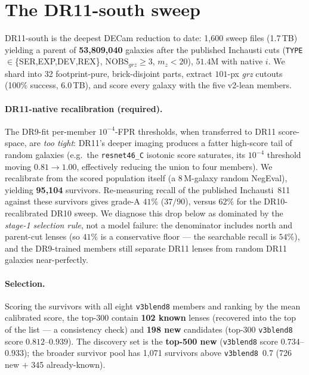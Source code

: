 \documentclass[11pt,letterpaper]{article}
\newcommand{\vb}{\texttt{v3blend8}}
\begin{document}
\section{The DR11-south sweep}
\label{sec:sweep}
DR11-south is the deepest DECam reduction to date: 1{,}600 sweep files (1.7\,TB) yielding a parent of
\textbf{53{,}809{,}040} galaxies after the published Inchausti cuts (\texttt{TYPE}$\in$\{SER,EXP,DEV,REX\},
$\mathrm{NOBS}_{grz}\!\ge\!3$, $m_z\!<\!20$), $51.4$M with native $i$. We shard into 32
footprint-pure, brick-disjoint parts, extract $101$-px \emph{grz} cutouts (100\% success, 6.0\,TB), and
score every galaxy with the five v2-lean members.

\paragraph{DR11-native recalibration (required).} The DR9-fit per-member $10^{-4}$-FPR thresholds, when
transferred to DR11 score-space, are \emph{too tight}: DR11's deeper imaging produces a fatter
high-score tail of random galaxies (e.g.\ the \texttt{resnet46\_C} isotonic score saturates, its
$10^{-4}$ threshold moving $0.81\!\to\!1.00$, effectively reducing the union to four members). We
recalibrate from the scored population itself (a 8\,M-galaxy random NegEval), yielding
\textbf{95{,}104} survivors. Re-measuring recall of the published Inchausti~811 against these survivors
gives grade-A $41\%$ ($37/90$), versus $62\%$ for the DR10-recalibrated DR10 sweep. We diagnose this
drop below as dominated by the \emph{stage-1 selection rule}, not a model failure: the denominator
includes north and parent-cut lenses (so $41\%$ is a conservative floor --- the searchable recall is
$54\%$), and the DR9-trained members still separate DR11 lenses from random DR11 galaxies near-perfectly.

\paragraph{Selection.} Scoring the survivors with all eight \vb{} members and ranking by the mean
calibrated score, the top-300 contain \textbf{102 known} lenses (recovered into the top of the list ---
a consistency check) and \textbf{198 new} candidates (top-300 \vb{} score $0.812$--$0.939$). The
discovery set is the \textbf{top-500 new} (\vb{} score $0.734$--$0.933$); the broader survivor pool has
1{,}071 survivors above \vb{}~0.7 (726 new $+$ 345 already-known).
\end{document}
